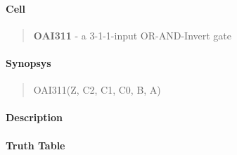 \label{OAI311}
\paragraph{Cell}
\begin{quote}
    \textbf{OAI311} - a 3-1-1-input OR-AND-Invert gate
\end{quote}

\paragraph{Synopsys}
\begin{quote}
    OAI311(Z, C2, C1, C0, B, A)
\end{quote}

\paragraph{Description}

%

\paragraph{Truth Table}


